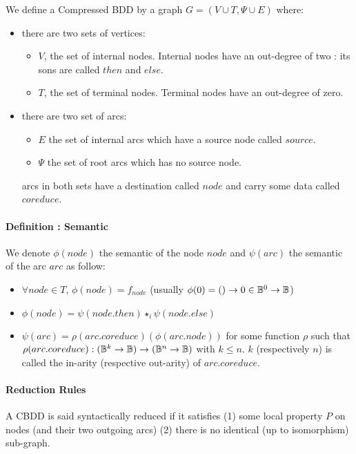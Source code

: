 \documentclass[a4paper,10pt]{article}
\begin{document}
We define a Compressed BDD by a graph $G = (V\cup T, \Psi\cup E)$ where:\begin{itemize}
  \item there are two sets of vertices:\begin{itemize}
    \item $V$, the set of internal nodes. Internal nodes have an out-degree of two : its sons are called $then$ and $else$.
    \item $T$, the set of terminal nodes. Terminal nodes have an out-degree of zero.
  \end{itemize}
  \item there are two set of arcs:\begin{itemize}
      \item $E$ the set of internal arcs which have a source node called $source$.
    \item $\Psi$ the set of root arcs which has no source node.
  \end{itemize} arcs in both sets have a destination called $node$ and carry some data called $coreduce$.
\end{itemize}

\paragraph*{Definition : Semantic\\}

We denote $\phi(node)$ the semantic of the node $node$ and $\psi(arc)$ the semantic of the arc $arc$ as follow:\begin{itemize}
\item $\forall node\in T$, $\phi(node) = f_{node}$ (usually $\phi(0) = () \rightarrow 0 \in \mathbb{B}^0 \rightarrow \mathbb{B}$)
\item $\phi(node) = \psi(node.then)\star_i\psi(node.else)$
\item $\psi(arc) = \rho(arc.coreduce)(\phi(arc.node))$ for some function $\rho$ such that $\rho(arc.coreduce) : (\mathbb{B}^k \rightarrow \mathbb{B}) \rightarrow (\mathbb{B}^n \rightarrow \mathbb{B})$ with $k\leq n$. $k$ (respectively $n$) is called the in-arity (respective out-arity) of $arc.coreduce$.
\end{itemize}

\paragraph{Reduction Rules}

A CBDD is said syntactically reduced if it satisfies (1) some local property $P$ on nodes (and their two outgoing arcs) (2) there is no identical (up to isomorphism) sub-graph.
\end{document}
